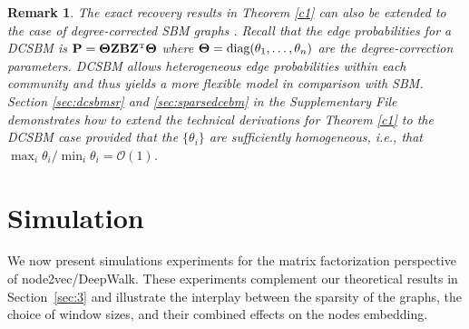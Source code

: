 \documentclass[10pt,journal,compsoc]{IEEEtran}
\newtheorem{remark}{Remark}
\newcommand{\T}{\top}
\def\T{{ \mathrm{\scriptscriptstyle T} }} %
\newcommand{\M}[1]{{{\mathbf{\MakeUppercase{#1}}}}}
\numberwithin{equation}{section}
\begin{document}
\begin{remark}
{\upshape The exact recovery results in Theorem \ref{c1} can also be extended to the case of degree-corrected SBM graphs \cite{karrer2011stochastic,zhao2012consistency,gao2018community}. Recall that the edge probabilities for a DCSBM is $\M P = \M \Theta \M Z\M B \M Z^\T \M \Theta$ where $\M \Theta = \text{diag}(\theta_1,\dots,\theta_n)$ are the degree-correction parameters. DCSBM allows heterogeneous edge probabilities within each community and thus yields a more flexible model in comparison with SBM. Section \ref{sec:dcsbmsr} and \ref{sec:sparsedcebm} in the Supplementary File demonstrates how to extend the technical derivations for Theorem \ref{c1} to the DCSBM case provided that the $\{\theta_i\}$ are sufficiently homogeneous, i.e., that $\max_i\theta_i/\min_i \theta_i = \mathcal{O}(1)$.
}
\end{remark}
\section{Simulation}\label{sec:simu}
We now present simulations experiments for the matrix factorization perspective of node2vec/DeepWalk. These experiments complement our theoretical
results in Section~\ref{sec:3} and illustrate the interplay between
the sparsity of the graphs, the choice of window sizes, and their
combined effects on the nodes embedding. 
\end{document}
